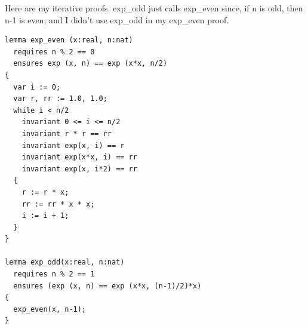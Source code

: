 \documentclass[11pt]{article}
\begin{document}
Here are my iterative proofs. \textsf{exp\_odd} just calls \textsf{exp\_even} since, if \textsf{n} is odd, then \textsf{n-1} is even; and I didn't use
\textsf{exp\_odd} in my \textsf{exp\_even} proof.
\begin{lstlisting}[language=dafny]
lemma exp_even (x:real, n:nat)
  requires n % 2 == 0
  ensures exp (x, n) == exp (x*x, n/2)
{
  var i := 0;
  var r, rr := 1.0, 1.0;
  while i < n/2
    invariant 0 <= i <= n/2
    invariant r * r == rr
    invariant exp(x, i) == r
    invariant exp(x*x, i) == rr
    invariant exp(x, i*2) == rr
  {
    r := r * x;
    rr := rr * x * x;
    i := i + 1;
  }
}

lemma exp_odd(x:real, n:nat)
  requires n % 2 == 1
  ensures (exp (x, n) == exp (x*x, (n-1)/2)*x)
{
  exp_even(x, n-1);
}
\end{lstlisting}
\end{document}
